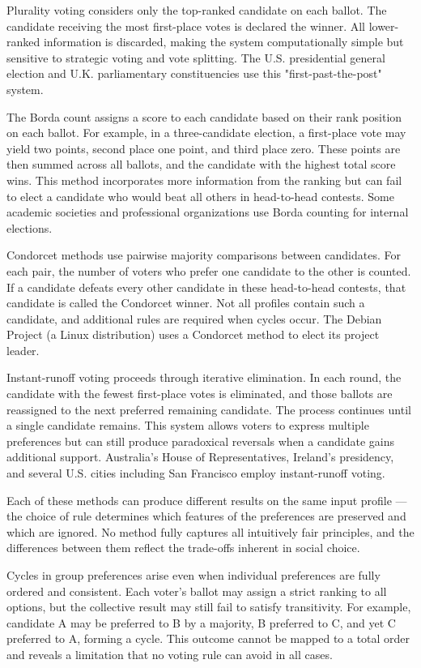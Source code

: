 Plurality voting considers only the top-ranked candidate on each ballot. The candidate receiving the most first-place votes is declared the winner. All lower-ranked information is discarded, making the system computationally simple but sensitive to strategic voting and vote splitting. The U.S. presidential general election and U.K. parliamentary constituencies use this "first-past-the-post" system.

The Borda count assigns a score to each candidate based on their rank position on each ballot. For example, in a three-candidate election, a first-place vote may yield two points, second place one point, and third place zero. These points are then summed across all ballots, and the candidate with the highest total score wins. This method incorporates more information from the ranking but can fail to elect a candidate who would beat all others in head-to-head contests. Some academic societies and professional organizations use Borda counting for internal elections.

Condorcet methods use pairwise majority comparisons between candidates. For each pair, the number of voters who prefer one candidate to the other is counted. If a candidate defeats every other candidate in these head-to-head contests, that candidate is called the Condorcet winner. Not all profiles contain such a candidate, and additional rules are required when cycles occur. The Debian Project (a Linux distribution) uses a Condorcet method to elect its project leader.

Instant-runoff voting proceeds through iterative elimination. In each round, the candidate with the fewest first-place votes is eliminated, and those ballots are reassigned to the next preferred remaining candidate. The process continues until a single candidate remains. This system allows voters to express multiple preferences but can still produce paradoxical reversals when a candidate gains additional support. Australia's House of Representatives, Ireland's presidency, and several U.S. cities including San Francisco employ instant-runoff voting.

Each of these methods can produce different results on the same input profile — the choice of rule determines which features of the preferences are preserved and which are ignored. No method fully captures all intuitively fair principles, and the differences between them reflect the trade-offs inherent in social choice.

Cycles in group preferences arise even when individual preferences are fully ordered and consistent. Each voter's ballot may assign a strict ranking to all options, but the collective result may still fail to satisfy transitivity. For example, candidate A may be preferred to B by a majority, B preferred to C, and yet C preferred to A, forming a cycle. This outcome cannot be mapped to a total order and reveals a limitation that no voting rule can avoid in all cases.

